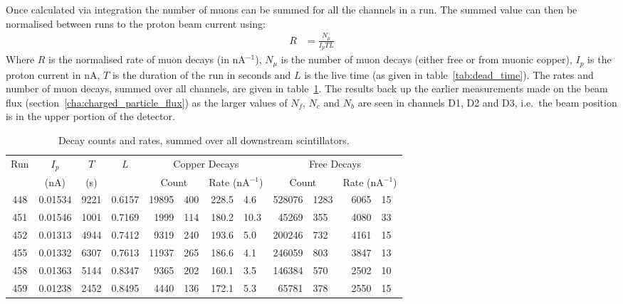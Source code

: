 \clearpage

Once calculated via integration the number of muons can be summed for all the channels in a run. The summed value can then be normalised between runs to the proton beam current using:
\begin{align}
  R &= \frac{N_{\mu}}{I_p T L} \label{equ:rate}
\end{align}
Where \( R \) is the normalised rate of muon decays (in nA\(^{-1}\)), \(N_{\mu}\) is the number of muon decays (either free or from muonic copper), \( I_p \) is the proton current in nA, \( T \) is the duration of the run in seconds and \(L\) is the live time (as given in table~\ref{tab:dead_time}). The rates and number of muon decays, summed over all channels, are given in table~\ref{tab:rates_res}. The results back up the earlier measurements made on the beam flux (section~\ref{cha:charged_particle_flux}) as the larger values of \(N_f\), \( N_c \) and \(N_b\) are seen in channels D1, D2 and D3, i.e.\ the beam position is in the upper portion of the detector.

\begin{table}
  \begin{center}
  \begin{tabular}{c | c | c | c | r@{\(\pm\)}l | r@{\(\pm\)}l | r@{\(\pm\)}l | r@{\(\pm\)}l  }
    \multirow{2}{*}{Run}  &  \(I_{p}\)  &  \(T\)  &  \multirow{2}{*}{\(L\)}  
         &  \multicolumn{4}{c|}{Copper Decays}   
                                          & \multicolumn{4}{c}{Free Decays}\\
                          &  (nA)       &   (s)   &
         &  \multicolumn{2}{c|}{Count}
                         &  \multicolumn{2}{c|}{ Rate (nA\(^{-1}\))}
                                          &  \multicolumn{2}{c|}{Count}
                                                            &  \multicolumn{2}{c}{Rate (nA\(^{-1}\))} \\
    \hline
    448  &  0.01534  &  9221  &  0.6157  &  19895 & 400  &  228.5 & 4.6   &  528076 & 1283  &  6065 & 15  \\
    451  &  0.01546  &  1001  &  0.7169  &   1999 & 114  &  180.2 & 10.3  &   45269 & 355   &  4080 & 33  \\
    452  &  0.01313  &  4944  &  0.7412  &   9319 & 240  &  193.6 & 5.0   &  200246 & 732   &  4161 & 15  \\
    455  &  0.01332  &  6307  &  0.7613  &  11937 & 265  &  186.6 & 4.1   &  246059 & 803   &  3847 & 13  \\
    458  &  0.01363  &  5144  &  0.8347  &   9365 & 202  &  160.1 & 3.5   &  146384 & 570   &  2502 & 10  \\
    459  &  0.01238  &  2452  &  0.8495  &   4440 & 136  &  172.1 & 5.3   &   65781 & 378   &  2550 & 15  \\
  \end{tabular}
  \end{center}
  \caption{Decay counts and rates, summed over all downstream scintillators.}
  \label{tab:rates_res}
\end{table}

